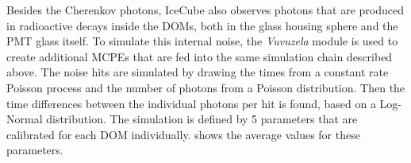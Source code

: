 Besides the Cherenkov photons, IceCube also observes photons that are produced in radioactive decays inside the DOMs, both in the glass housing sphere and the PMT glass itself. To simulate this internal noise, the \emph{Vuvuzela} module  is used to create additional MCPEs that are fed into the same simulation chain described above. 
The noise hits are simulated by drawing the times from a constant rate Poisson process and the number of photons from a Poisson distribution. Then the time differences between the individual photons per hit is found, based on a Log-Normal distribution. The simulation is defined by 5 parameters that are calibrated for each DOM individually.  shows the average values for these parameters.
